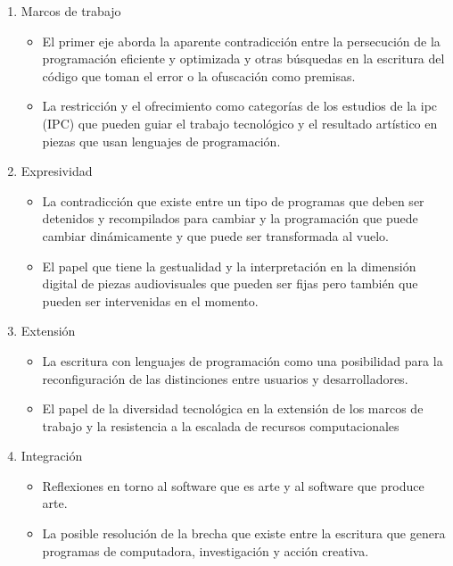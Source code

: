 \begin{enumerate}

\item Marcos de trabajo 
  \begin{itemize}
  \item El primer eje aborda la aparente contradicción entre la persecución de la programación eficiente y optimizada y otras búsquedas en la escritura del código que toman el error o la ofuscación como premisas. 
  \item La restricción y el ofrecimiento como categorías de los estudios de la \Gls{ipc} (IPC) que pueden guiar el trabajo tecnológico y el resultado artístico en piezas que usan lenguajes de programación.  
  \end{itemize}

\item Expresividad
  \begin{itemize}
    \item La contradicción que existe entre un tipo de programas que deben ser detenidos y recompilados para cambiar y la programación que puede cambiar dinámicamente y que puede ser transformada al vuelo. 
  \item El papel que tiene la gestualidad y la interpretación en la dimensión digital de piezas audiovisuales que pueden ser fijas pero también que pueden ser intervenidas en el momento. 
  \end{itemize}

\item Extensión
  \begin{itemize}
  \item La escritura con lenguajes de programación como una posibilidad para la reconfiguración de las distinciones entre usuarios y desarrolladores.
  \item El papel de la diversidad tecnológica en la extensión de los marcos de trabajo y la resistencia a la escalada de recursos computacionales
  \end{itemize}
  
\item Integración 
  \begin{itemize}
  \item Reflexiones en torno al software que es arte y al software que produce arte.
  \item La posible resolución de la brecha que existe entre la escritura que genera programas de computadora, investigación y acción creativa. 
  \end{itemize}
  
\end{enumerate}

